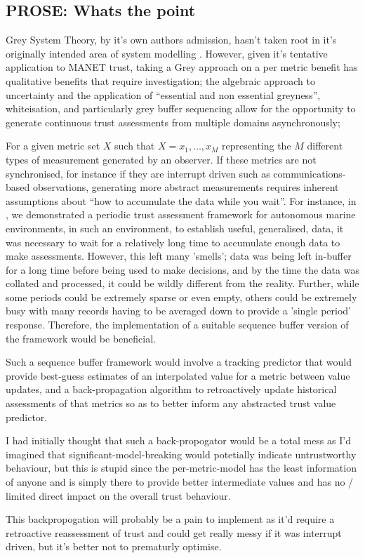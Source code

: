 \subsection{PROSE: Whats the point}

Grey System Theory, by it's own authors admission, hasn't taken root in it's originally intended area of system modelling \cite{Liu11}.
However, given it's tentative application to MANET trust, taking a Grey approach on a per metric benefit has qualitative benefits that require investigation; the algebraic approach to uncertainty and the application of ``essential and non essential greyness'', whiteisation, and particularly grey buffer sequencing allow for the opportunity to generate continuous trust assessments from multiple domains asynchronously;

For a given metric set $X$ such that $X = {x_1,\dots,x_M}$ representing the $M$ different types of measurement generated by an observer. If these metrics are not synchronised, for instance if they are interrupt driven such as communications-based observations, generating more abstract measurements requires inherent assumptions about ``how to accumulate the data while you wait''. For instance, in \cite{Bolster2015}, we demonstrated a periodic trust assessment framework for autonomous marine environments, in such an environment, to establish useful, generalised, data, it was necessary to wait for a relatively long time to accumulate enough data to make assessments.
However, this left many 'smells'; data was being left in-buffer for a long time before being used to make decisions, and by the time the data was collated and processed, it could be wildly different from the reality. Further, while some periods could be extremely sparse or even empty, others could be extremely busy with many records having to be averaged down to provide a 'single period' response. 
Therefore, the implementation of a suitable sequence buffer version of the framework would be beneficial.

Such a sequence buffer framework would involve a tracking predictor that would provide best-guess estimates of an interpolated value for a metric between value updates, and a back-propagation algorithm to retroactively update historical assessments of that metrics so as to better inform any abstracted trust value predictor.

I had initially thought that such a back-propogator would be a total mess as I'd imagined that significant-model-breaking would potetially indicate untrustworthy behaviour, but this is stupid since the per-metric-model has the least information of anyone and is simply there to provide better intermediate values and has no / limited direct impact on the overall trust behaviour. 

This backpropogation will probably be a pain to implement as it'd require a retroactive reassessment of trust and could get really messy if it was interrupt driven, but it's better not to prematurly optimise.


\ifx\ifthesis\undefined
	
\else
\fi
